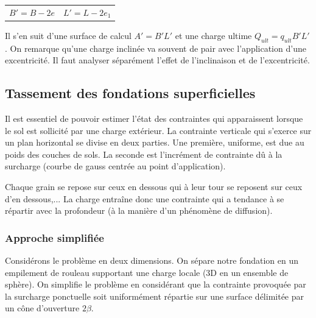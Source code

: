             \begin{center}
                \begin{tabular}{cc}
                     $B' = B - 2e$ \: \: \: &  $L' = L - 2e_1$   
                \end{tabular}
            \end{center} 
            
            Il s'en suit d'une surface de calcul $A' = B'L'$ et une charge ultime $Q_{ult} = q_{ult} B' L'$. On remarque qu'une charge inclinée va souvent de pair avec l'application d'une excentricité. Il faut analyser séparément l'effet de l'inclinaison et de l'excentricité.
            
    \subsection{Tassement des fondations superficielles}
    
        Il est essentiel de pouvoir estimer l'état des contraintes qui apparaissent lorsque le sol est sollicité par une charge extérieur. La contrainte verticale qui s'exerce sur un plan horizontal se divise en deux parties. Une première, uniforme, est due au poids des couches de sols. La seconde est l'incrément de contrainte dû à la surcharge (courbe de gauss centrée au point d'application).
        
        Chaque grain se repose sur ceux en dessous qui à leur tour se reposent sur ceux d'en dessous,... La charge entraîne donc une contrainte qui a tendance à se répartir avec la profondeur (à la manière d'un phénomène de diffusion).
            
            \subsubsection{Approche simplifiée}
            
            Considérons le problème en deux dimensions. On sépare notre fondation en un empilement de rouleau supportant une charge locale (3D en un ensemble de sphère). On simplifie le problème en considérant que la contrainte provoquée par la surcharge ponctuelle soit uniformément répartie sur une surface délimitée par un cône d'ouverture $2\beta$. 
            
